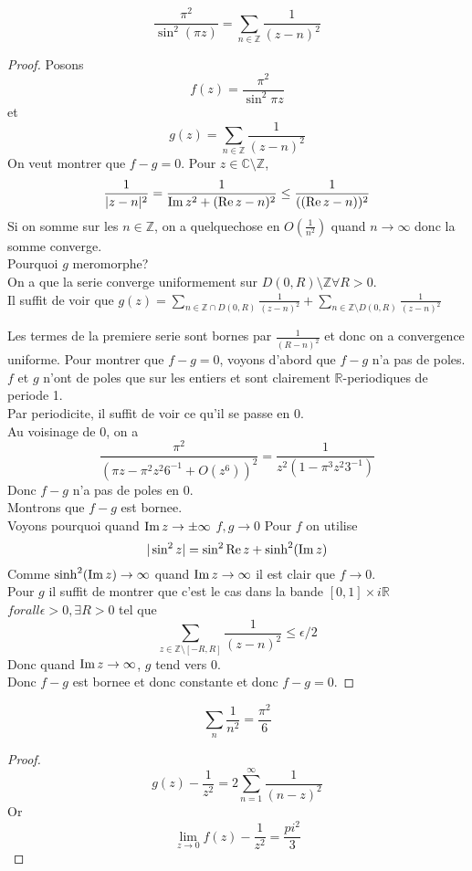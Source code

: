 \documentclass[../main.tex]{subfiles}
\begin{document}
\begin{propo}
\[ 
\frac{\pi^{2}}{\sin^{2}( \pi z )} = \sum_{n\in \mathbb{Z}}^{ }\frac{1}{( z-n) ^{2}}
\]

\end{propo}
\begin{proof}
Posons
\[ 
f( z) = \frac{\pi^{2}}{\sin^{2}\pi z}
\]
et
\[ 
g( z) = \sum_{n\in \mathbb{Z}}^{ } \frac{1}{( z-n)^{2}}
\]
On veut montrer que $f-g=0$.
Pour $z\in \mathbb{C}\setminus \mathbb{Z}$,
\[ 
\frac{1}{|z-n|^{2}}= \frac{1}{ \operatorname{Im} z ^{2}+ ( \operatorname{Re} z -n )^{2}} \leq  \frac{1}{( ( \operatorname{Re} z -n))^{2} }
\]
Si on somme sur les $n \in \mathbb{Z}$, on a quelquechose en $O( \frac{1}{n^{2}}) $ quand $n\to \infty $ donc la somme converge.\\
Pourquoi $g$ meromorphe?\\
On a que la serie converge uniformement sur $D( 0,R) \setminus \mathbb{Z}\forall R>0$.\\
Il suffit de voir que $g( z) = \sum_{n \in \mathbb{Z}\cap D( 0,R)  }^{ } \frac{1}{( z-n)^{2}} + \sum_{n \in \mathbb{Z}\setminus D( 0,R) }^{ } \frac{1}{( z-n)^{2}} $ 

Les termes de la premiere serie sont bornes par $\frac{1}{( R-n)^{2}}$ et donc on a convergence uniforme.	
Pour montrer que $f-g =0$, voyons d'abord que $f-g$ n'a pas de poles.\\
$f$ et $g$ n'ont de poles que sur les entiers et sont clairement $\mathbb{R}$-periodiques de periode 1.\\
Par periodicite, il suffit de voir ce qu'il se passe en 0.\\
Au voisinage de 0, on a 
\[ 
\frac{\pi^{2}}{( \pi z - \pi^{2}z^{2} 6^{-1}+ O( z^{6})  )^{2}} = \frac{1}{z^{2}( 1- \pi^{3}z^{2} 3^{-1}) }
\]
Donc $f-g$ n'a pas de poles en 0.\\
Montrons que $f-g$ est bornee.\\
Voyons pourquoi quand $\operatorname{Im} z\to \pm\infty $ $f,g\to 0$ Pour $f$ on utilise
\[ 
|\sin^{2}z| = \sin^{2}\operatorname{Re} z+ \sinh^{2}( \operatorname{Im} z ) 
\]
Comme $\sinh^{2}( \operatorname{Im} z) \to \infty $ quand $\operatorname{Im} z\to \infty $ il est clair que $f\to 0$.\\
Pour $g$ il suffit de montrer que c'est le cas dans la bande $ [ 0,1] \times i \mathbb{R}$ 	
$ forall \epsilon>0, \exists R>0 $ tel que
\[ 
\sum_{z\in \mathbb{Z}\setminus [ -R,R] }^{ } \frac{1}{( z-n) ^{2}} \leq \epsilon /2
\]
Donc quand $\operatorname{Im} z \to \infty $, $g$ tend vers 0.\\
Donc $f-g$ est bornee et donc constante et donc $f-g=0$.
\end{proof}
\begin{propo}

\[ 
\sum_{n}^{ } \frac{1}{n^{2}}= \frac{\pi^{2}}{6}
\]

\end{propo}
\begin{proof}
\[ 
g( z) -\frac{1}{z^{2}}= 2 \sum_{n=1}^{ \infty } \frac{1}{( n-z)^{2}}
\]
Or
\[ 
\lim_{z \to 0} f( z) -\frac{1}{z^{2}}= \frac{pi^{2}}{3}
\]


\end{proof}
\end{document}
